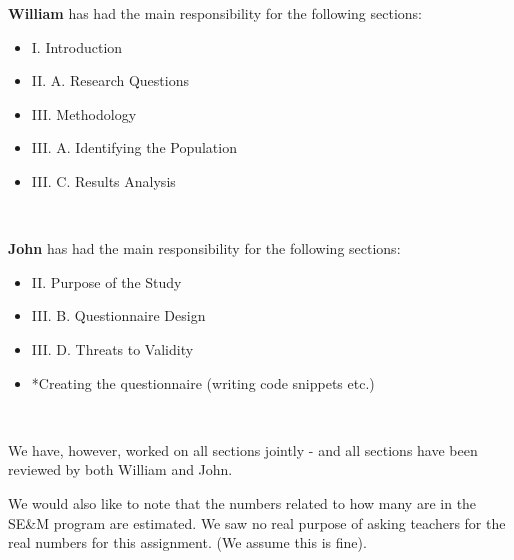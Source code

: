 \documentclass[10pt,twocolumn]{article}
\begin{document}




\textbf{William} has had the main responsibility for the following sections:
\begin{itemize} \renewcommand{\labelitemi}{$\bullet$} 
\item I. Introduction
\item II. A. Research Questions
\item III. Methodology
\item III. A. Identifying the Population
\item III. C. Results Analysis
\end{itemize}
\ 


\textbf{John} has had the main responsibility for the following sections:
\begin{itemize} \renewcommand{\labelitemi}{$\bullet$} 
\item II. Purpose of the Study
\item III. B. Questionnaire Design
\item III. D. Threats to Validity
\item *Creating the questionnaire (writing code snippets etc.)
\end{itemize}
\

We have, however, worked on all sections jointly - and all sections have been reviewed by both William and John. 

We would also like to note that the numbers related to how many are in the SE\&M program are estimated. We saw no real purpose of asking teachers for the real numbers for this assignment. (We assume this is fine). 
\end{document}
